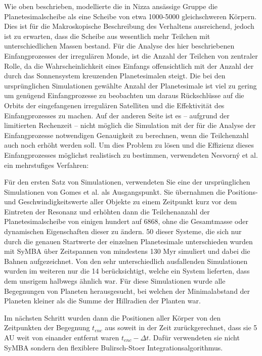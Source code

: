 \documentclass[10pt,a4paper,twoside]{article}
\begin{document}
Wie oben beschrieben, modellierte die in Nizza ansässige Gruppe die Planetesimalscheibe als eine Scheibe von etwa 1000-5000 gleichschweren Körpern. Dies ist für die Makroskopische Beschreibung des Verhaltens ausreichend, jedoch ist zu erwarten, dass die Scheibe aus wesentlich mehr Teilchen mit unterschiedlichen Massen bestand.
Für die Analyse des hier beschriebenen Einfangprozesses der irregulären Monde, ist die Anzahl der Teilchen von zentraler Rolle, da die Wahrscheinlichkeit eines Einfangs offensichtlich mit der Anzahl der durch das Sonnensystem kreuzenden Planetesimalen steigt.
Die bei den ursprünglichen Simulationen gewählte Anzahl der Planetesimale ist viel zu gering um genügend Einfangprozesse zu beobachten um daraus Rückschlüsse auf die Orbits der eingefangenen irregulären Satelliten und die Effektivität des Einfangprozesses zu machen.
Auf der anderen Seite ist es -- aufgrund der limitierten Rechenzeit -- nicht möglich die Simulation mit der für die Analyse der Einfangprozesse notwendigen Genauigkeit zu berechnen, wenn die Teilchenzahl auch noch erhöht werden soll.
Um dies Problem zu lösen und die Effizienz dieses Einfangprozesses möglichst realistisch zu bestimmen, verwendeten Nesvorn\'{y} et al. ein mehrstufiges Verfahren: %

Für den ersten Satz von Simulationen, verwendeten Sie eine der ursprünglichen Simulationen von Gomes et al. als Ausgangspunkt\cite{Nesvorny2007}. %
Sie übernahmen die Positions- und Geschwindigkeitswerte aller Objekte zu einem Zeitpunkt kurz vor dem Eintreten der Resonanz und erhöhten dann die Teilchenanzahl der Planetesimalscheibe von einigen hundert auf 6868, %
ohne die Gesamtmasse oder dynamischen Eigenschaften dieser zu ändern. 50 dieser Systeme, die sich nur durch die genauen Startwerte der einzelnen Planetesimale unterschieden wurden mit SyMBA über Zeitspannen von mindestens 130 Myr simuliert und dabei die Bahnen aufgezeichnet.
Von den sehr unterschiedlich ausfallenden Simulationen wurden im weiteren nur die 14 berücksichtigt, welche ein System lieferten, dass dem unsrigem halbwegs ähnlich war\cite{Nesvorny2007}. %
Für diese Simulationen wurde alle Begegnungen von Planeten herausgesucht, bei welchen der Minimalabstand der Planeten kleiner als die Summe der Hillradien der Planten war. %

Im nächsten Schritt wurden dann die Positionen aller Körper von den Zeitpunkten der Begegnung $t_{enc}$ aus soweit in der Zeit zurückgerechnet, dass sie 5 AU weit von einander entfernt waren  $t_{enc} - \Delta t$\cite{Nesvorny2007}.
Dafür verwendeten sie nicht SyMBA sondern den flexiblere Bulirsch-Stoer Integrationsalgorithmus. %
\end{document}
